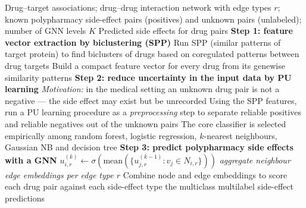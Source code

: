 \documentclass{article}
\begin{document}
\begin{algorithm}[!h]
\renewcommand{\algorithmicrequire}{\textbf{Input:}} %
\renewcommand{\algorithmicensure}{\textbf{Output:}} %
	\caption{PU-GNN (polypharmacy side-effect prediction via biclustering, PU learning and a GNN)} %
	\begin{algorithmic}[1] %
	    \REQUIRE
	    Drug--target associations; drug--drug interaction network with edge types $r$;
	    known polypharmacy side-effect pairs (positives) and unknown pairs (unlabeled);
	    number of GNN levels $K$
	    \ENSURE
	    Predicted side effects for drug pairs
	    \STATE \textbf{Step 1: feature vector extraction by biclustering (SPP)}
	    \STATE Run SPP (similar patterns of target protein) to find biclusters of drugs based on
	    coregulated patterns between drug targets %
	    \STATE Build a compact feature vector for every drug from its genewise similarity patterns
	    \STATE \textbf{Step 2: reduce uncertainty in the input data by PU learning}
	    \STATE \emph{Motivation:} in the medical setting an unknown drug pair is not a negative ---
	    the side effect may exist but be unrecorded %
	    \STATE Using the SPP features, run a PU learning procedure as a \emph{preprocessing} step
	    to separate reliable positives and reliable negatives out of the unknown pairs %
	    \STATE \quad The core classifier is selected empirically among random forest, logistic
	    regression, $k$-nearest neighbours, Gaussian NB and decision tree %
	    \STATE \textbf{Step 3: predict polypharmacy side effects with a GNN}
	    \STATE $u_{i,r}^{(k)}\leftarrow \sigma\!\left(\mathrm{mean}\!\left(\{u_{j,r}^{(k-1)}:v_{j}\in N_{i,r}\}\right)\right)$
	    \hfill \emph{aggregate neighbour edge embeddings per edge type $r$} %
	    \ENDFOR
	    \STATE Combine node and edge embeddings to score each drug pair against each side-effect type
	    \RETURN the multiclass multilabel side-effect predictions
	\end{algorithmic}
\end{algorithm}
\end{document}
